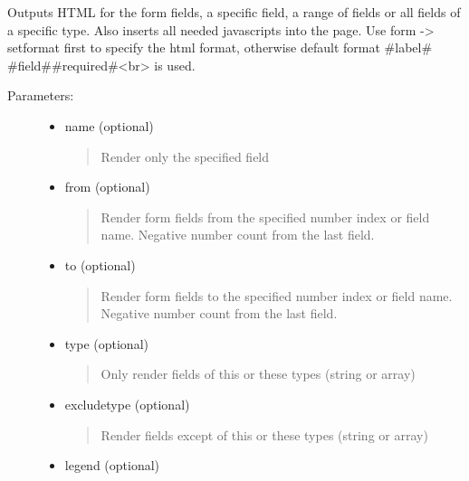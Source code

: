 \documentclass[letterpaper,10pt,english]{sphinxmanual}
\begin{document}
\begin{fulllineitems}
\begin{fulllineitems}
Outputs HTML for the form fields, a specific field, a range of fields or all
fields of a specific type. Also inserts all needed javascripts into the page.
Use form -\textgreater{} setformat first to specify the html format, otherwise default
format \#label\# \#field\#\#required\#\textless{}br\textgreater{} is used.
\begin{description}
\item[{Parameters:}] \leavevmode\begin{itemize}
\item {} 
name (optional)
\begin{quote}

Render only the specified field
\end{quote}

\item {} 
from (optional)
\begin{quote}

Render form fields from the specified number index or field name. Negative number count from the last field.
\end{quote}

\item {} 
to (optional)
\begin{quote}

Render form fields to the specified number index or field name. Negative number count from the last field.
\end{quote}

\item {} 
type (optional)
\begin{quote}

Only render fields of this or these types (string or array)
\end{quote}

\item {} 
excludetype (optional)
\begin{quote}

Render fields except of this or these types (string or array)
\end{quote}

\item {} 
legend (optional)
\begin{quote}


\end{quote}
\end{itemize}
\end{description}
\end{fulllineitems}
\end{fulllineitems}
\end{document}
